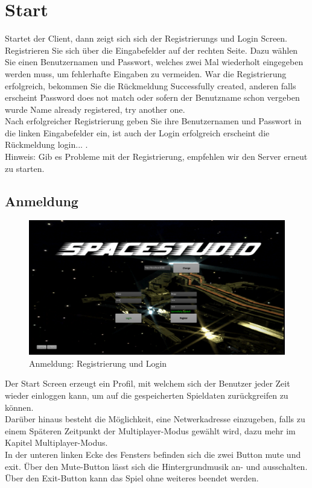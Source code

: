 \documentclass[fontsize=12pt,paper=a4,twoside]{scrartcl}
\begin{document}

\section{Start}

Startet der Client, dann zeigt sich sich der Registrierungs und Login Screen.
Registrieren Sie sich über die Eingabefelder auf der rechten Seite. Dazu wählen Sie einen Benutzernamen und Passwort, welches zwei Mal wiederholt eingegeben werden muss, um fehlerhafte Eingaben zu vermeiden.
War die Registrierung erfolgreich, bekommen Sie die Rückmeldung Successfully created, anderen falls erscheint Password does not match oder sofern der Benutzname schon vergeben wurde Name already
registered, try another one.\\
Nach erfolgreicher Registrierung geben Sie ihre Benutzernamen und Passwort in die linken Eingabefelder ein, ist auch der Login erfolgreich erscheint die Rückmeldung login... .\\

Hinweis: Gib es Probleme mit der Registrierung, empfehlen wir den Server erneut zu starten.

\subsection{Anmeldung}
\begin{figure}[htp]
\centering
	\includegraphics[width=1.00\linewidth]{pics/StartScreen01.png}
	\caption{Anmeldung: Registrierung und Login}
	\label{fig1}
\end{figure}

Der Start Screen erzeugt ein Profil, mit welchem sich der Benutzer jeder Zeit wieder einloggen kann, um auf die gespeicherten Spieldaten zurückgreifen zu können. \\
Darüber hinaus besteht die Möglichkeit, eine Netwerkadresse einzugeben, falls zu einem Späteren Zeitpunkt der Multiplayer-Modus gewählt wird, dazu mehr im Kapitel Multiplayer-Modus.\\
In der unteren linken Ecke des Fensters befinden sich die zwei Button mute und exit. Über den Mute-Button lässt sich die Hintergrundmusik an- und ausschalten. 
Über den Exit-Button kann das Spiel ohne weiteres beendet werden.
\end{document}
